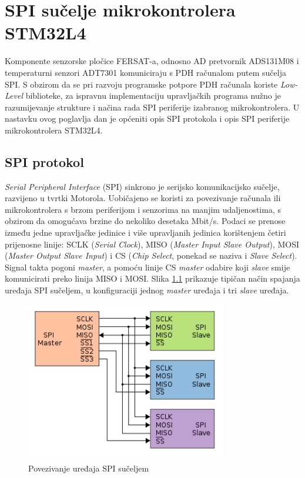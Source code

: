 \chapter{SPI sučelje mikrokontrolera STM32L4}
	Komponente senzorske pločice FERSAT-a, odnosno AD pretvornik ADS131M08 i temperaturni senzori ADT7301 komuniciraju s PDH računalom putem sučelja SPI. S obzirom da se pri razvoju programske potpore PDH računala koriste \textit{Low-Level} biblioteke, za ispravnu implementaciju upravljačkih programa nužno je razumijevanje strukture i načina rada SPI periferije izabranog mikrokontrolera. U nastavku ovog poglavlja dan je općeniti opis SPI protokola i opis SPI periferije mikrokontrolera STM32L4.
	
	\section{SPI protokol}
		\textit{Serial Peripheral Interface} (SPI) sinkrono je serijsko komunikacijsko sučelje, razvijeno u tvrtki Motorola. Uobičajeno se koristi za povezivanje računala ili mikrokontrolera s brzom periferijom i senzorima na manjim udaljenostima, s obzirom da omogućava brzine do nekoliko desetaka Mbit/s. Podaci se prenose između jedne upravljačke jedinice  i više upravljanih jedinica  korištenjem četiri prijenosne linije: SCLK (\textit{Serial Clock}), MISO (\textit{Master Input Slave Output}), MOSI (\textit{Master Output Slave Input}) i CS (\textit{Chip Select}, ponekad se naziva i \textit{Slave Select}). Signal takta pogoni \textit{master}, a pomoću linije CS \textit{master} odabire koji \textit{slave} smije komunicirati preko linija MISO i MOSI. Slika \ref{fig:spi} prikazuje tipičan način spajanja uređaja SPI sučeljem, u konfiguraciji jednog \textit{master} uređaja i tri \textit{slave} uređaja.
		
		\begin{figure}[htb]
			\centering
			\includegraphics[height=7cm]{slike/spi.png}
			\caption{Povezivanje uređaja SPI sučeljem}
			\label{fig:spi}
		\end{figure}
	
